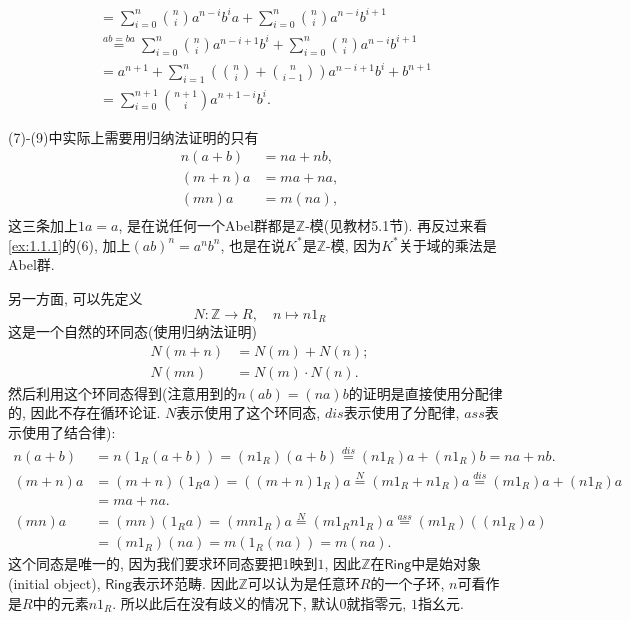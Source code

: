 \begin{solution}
\begin{enumerate}[(1)]
\[\begin{aligned}
        &= \sum_{i = 0}^{n} \binom{n}{i} a^{n - i}b^ia + \sum_{i = 0}^{n} \binom{n}{i} a^{n - i}b^{i + 1}\\
        &\overset{ab = ba}= \sum_{i = 0}^{n} \binom{n}{i} a^{n - i + 1}b^i + \sum_{i = 0}^{n} \binom{n}{i} a^{n - i}b^{i + 1}\\
        &= a^{n + 1} + \sum_{i = 1}^{n} \left(\binom{n}{i} + \binom{n}{i - 1}\right) a^{n - i + 1}b^{i} + b^{n + 1}\\
        &= \sum_{i = 0}^{n + 1} \binom{n + 1}{i} a^{n + 1 - i}b^i.
    \end{aligned}
    \]
    \end{enumerate}
(7)-(9)中实际上需要用归纳法证明的只有
\[
\begin{aligned}
    n(a + b) &= na + nb,\\
    (m + n)a &= ma + na,\\
    (mn)a &= m(na),\\
\end{aligned}
\]
这三条加上$1a = a$, 是在说任何一个Abel群都是$\mathbb{Z}$-模(见教材5.1节). 再反过来看\ref{ex:1.1.1}的(6), 加上$(ab)^n = a^nb^n$, 也是在说$K^*$是$\mathbb{Z}$-模, 因为$K^*$关于域的乘法是Abel群.

另一方面, 可以先定义
\[
    N: \mathbb{Z} \to R,\quad n \mapsto n1_R
\]
这是一个自然的环同态(使用归纳法证明)
\[
    \begin{aligned}
        N(m + n) &= N(m) + N(n);\\
        N(mn) &= N(m) \cdot N(n).
    \end{aligned}
\]
然后利用这个环同态得到(注意用到的$n(ab) = (na)b$的证明是直接使用分配律的, 因此不存在循环论证. $N$表示使用了这个环同态, $dis$表示使用了分配律, $ass$表示使用了结合律):
\[
    \begin{aligned}
        n(a + b) &= n(1_R(a + b)) = (n1_R)(a + b) \overset{dis}= (n1_R)a + (n1_R)b = na + nb.\\
        (m + n)a &= (m + n)(1_Ra) = ((m + n)1_R)a \overset{N}= (m1_R + n1_R)a \overset{dis}= (m1_R)a + (n1_R)a\\
        &= ma + na.\\
        (mn)a &= (mn)(1_Ra) = (mn1_R)a \overset{N}= (m1_Rn1_R)a \overset{ass}= (m1_R)((n1_R)a)\\
        &= (m1_R)(na) = m(1_R(na)) = m(na).
    \end{aligned}
\]
这个同态是唯一的, 因为我们要求环同态要把$1$映到$1$, 因此$\mathbb{Z}$在$\mathsf{Ring}$中是始对象(initial object), $\mathsf{Ring}$表示环范畴. 因此$\mathbb{Z}$可以认为是任意环$R$的一个子环, $n$可看作是$R$中的元素$n1_R$. 所以此后在没有歧义的情况下, 默认$0$就指零元, $1$指幺元.
\end{solution}

